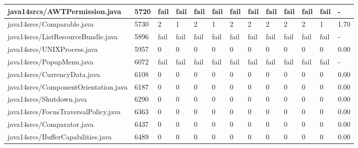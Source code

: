 \begin{tabular}{|l|l|l|l|l|l|l|l|l|l|l|l|l|}
\hline
java14srcs/AWTPermission.java                      & 5720        & fail      & fail      & fail      & fail      & fail      & fail      & fail      & fail      & fail      & fail      & -         \\
\hline
java14srcs/Comparable.java                         & 5730        & 2         & 1         & 2         & 1         & 2         & 2         & 2         & 2         & 2         & 1         & 1.70      \\
\hline
java14srcs/ListResourceBundle.java                 & 5896        & fail      & fail      & fail      & fail      & fail      & fail      & fail      & fail      & fail      & fail      & -         \\
\hline
java14srcs/UNIXProcess.java                        & 5957        & 0         & 0         & 0         & 0         & 0         & 0         & 0         & 0         & 0         & 0         & 0.00      \\
\hline
java14srcs/PopupMenu.java                          & 6072        & fail      & fail      & fail      & fail      & fail      & fail      & fail      & fail      & fail      & fail      & -         \\
\hline
java14srcs/CurrencyData.java                       & 6108        & 0         & 0         & 0         & 0         & 0         & 0         & 0         & 0         & 0         & 0         & 0.00      \\
\hline
java14srcs/ComponentOrientation.java               & 6187        & 0         & 0         & 0         & 0         & 0         & 0         & 0         & 0         & 0         & 0         & 0.00      \\
\hline
java14srcs/Shutdown.java                           & 6290        & 0         & 0         & 0         & 0         & 0         & 0         & 0         & 0         & 0         & 0         & 0.00      \\
\hline
java14srcs/FocusTraversalPolicy.java               & 6363        & 0         & 0         & 0         & 0         & 0         & 0         & 0         & 0         & 0         & 0         & 0.00      \\
\hline
java14srcs/Comparator.java                         & 6437        & 0         & 0         & 0         & 0         & 0         & 0         & 0         & 0         & 0         & 0         & 0.00      \\
\hline
java14srcs/BufferCapabilities.java                 & 6489        & 0         & 0         & 0         & 0         & 0         & 0         & 0         & 0         & 0         & 0         & 0.00      \\

\end{tabular}
